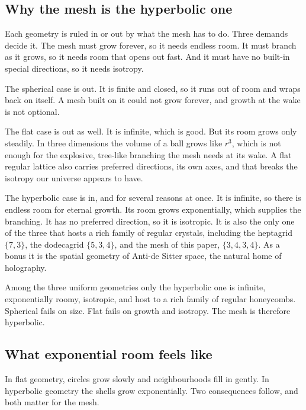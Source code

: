 \subsection{Why the mesh is the hyperbolic one}

Each geometry is ruled in or out by what the mesh has to do. Three demands decide it. The mesh must grow forever, so it needs endless room. It must branch as it grows, so it needs room that opens out fast. And it must have no built-in special directions, so it needs isotropy.

The spherical case is out. It is finite and closed, so it runs out of room and wraps back on itself. A mesh built on it could not grow forever, and growth at the wake is not optional.

The flat case is out as well. It is infinite, which is good. But its room grows only steadily. In three dimensions the volume of a ball grows like $r^3$, which is not enough for the explosive, tree-like branching the mesh needs at its wake. A flat regular lattice also carries preferred directions, its own axes, and that breaks the isotropy our universe appears to have.

The hyperbolic case is in, and for several reasons at once. It is infinite, so there is endless room for eternal growth. Its room grows exponentially, which supplies the branching. It has no preferred direction, so it is isotropic. It is also the only one of the three that hosts a rich family of regular crystals, including the heptagrid $\{7,3\}$, the dodecagrid $\{5,3,4\}$, and the mesh of this paper, $\{3,4,3,4\}$. As a bonus it is the spatial geometry of Anti-de Sitter space, the natural home of holography.

\begin{result}
Among the three uniform geometries only the hyperbolic one is infinite, exponentially roomy, isotropic, and host
to a rich family of regular honeycombs. Spherical fails on size. Flat fails on growth and isotropy. The mesh is
therefore hyperbolic.
\end{result}

\subsection{What exponential room feels like}

In flat geometry, circles grow slowly and neighbourhoods fill in gently. In hyperbolic geometry the shells grow exponentially. Two consequences follow, and both matter for the mesh.

